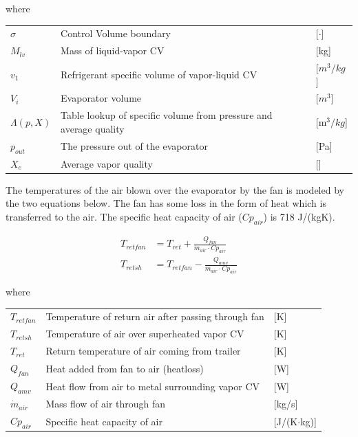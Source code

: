 where

\begin{center}
	\begin{tabular}{l p{10cm} l}
		$\sigma$       & Control Volume boundary                                           & [$\cdot$]            \\
		$M_{lv}$       & Mass of liquid-vapor CV                                           & [\si{kg}]            \\
		$v_1$          & Refrigerant specific volume of vapor-liquid CV                    & [$\si{m}^3/\si{kg}$] \\
		$V_i$          & Evaporator volume                                                 & [$\si{m}^3$]         \\
		$\Lambda(p,X)$ & Table lookup of specific volume from pressure and average quality & [\si{m}$^3/\si{kg}$] \\
		$ p_{out} $    & The pressure out of the evaporator                                & [\si{Pa}]            \\
		$ X_e $        & Average vapor quality                                             & []
	\end{tabular}
\end{center}

The temperatures of the air blown over the evaporator by the fan is modeled by the two equations below. The fan has some loss in the form of heat which is transferred to the air. The specific heat capacity of air ($Cp_{air}$) is 718 \si{J}/(\si{kg}\si{K}).

\begin{align}
	T_{retfan} 		& = T_{ret} + \frac{Q_{fan}}{\dot{m}_{air} \cdot Cp_{air}} 		\label{eq:T_retfan} 		\\
	T_{retsh} 		& = T_{retfan} - \frac{Q_{amv}}{\dot{m}_{air} \cdot Cp_{air}} 	\label{eq:T_retsh}
\end{align}

where

\begin{center}
	\begin{tabular}{l p{10cm} l}
		$T_{retfan}$    & Temperature of return air after passing through fan & [\si{K}]                          \\
		$T_{retsh}$     & Temperature of air over superheated vapor CV        & [\si{K}]                          \\
		$T_{ret}$       & Return temperature of air coming from trailer       & [\si{K}]                          \\
		$Q_{fan}$       & Heat added from fan to air (heatloss)               & [\si{W}]                          \\
		$Q_{amv}$       & Heat flow from air to metal surrounding vapor CV    & [\si{W}]                          \\
		$\dot{m}_{air}$ & Mass flow of air through fan                        & [\si{kg}/\si{s}]                  \\
		$Cp_{air}$      & Specific heat capacity of air                       & [\si{J}/(\si{K}$ \cdot $\si{kg})]
	\end{tabular}
\end{center}

